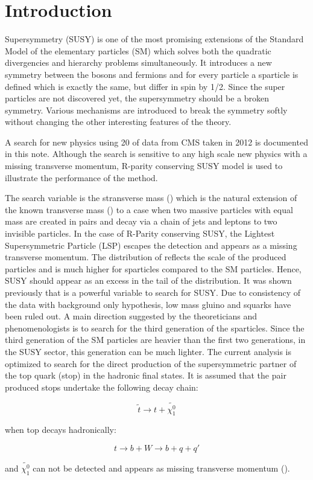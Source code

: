\section{Introduction}
\label{sect:introduction}
Supersymmetry \cite{Martin:1997ns} (SUSY) is one of the most promising extensions of the 
Standard Model of the elementary particles (SM) which solves both the 
quadratic divergencies and hierarchy problems simultaneously. It introduces a new symmetry between the bosons and fermions and 
for every particle a sparticle is defined which is exactly the same, but differ in spin by 1/2. 
Since the super particles are not discovered yet, the supersymmetry should be a broken symmetry. Various mechanisms are introduced to 
break the symmetry softly without changing the other interesting features of the theory.

A search for new physics using 20 \invfb of data from CMS taken in 2012 is documented in this note. Although the search is sensitive to any high scale 
new physics with a missing transverse momentum, R-parity conserving SUSY model is used to illustrate the performance of the method.

The search variable is the stransverse mass (\mttwo) which is the natural extension of the known transverse mass (\mt) to a case 
when two massive particles with equal mass are created in pairs and decay via a chain of jets and leptons to two invisible particles. 
In the case of R-Parity conserving SUSY, the Lightest Supersymmetric Particle (LSP) escapes the detection and appears as 
a missing transverse momentum.
The distribution of \mttwo reflects the scale of the produced particles and is much higher for sparticles
compared to the SM particles. Hence, SUSY should appear as an excess in the tail of the \mttwo distribution.
It was shown previously \cite{MT2_2011} that \mttwo is a powerful variable to search for SUSY. Due to consistency of the data with background 
only hypothesis, low mass gluino and squarks have been ruled out. A main direction suggested by the theoreticians and phenomenologists is to 
search for the third generation of the sparticles. %
Since the third generation of the SM particles are heavier than the first two generations, 
in the SUSY sector, this generation can be much lighter. The current analysis is optimized to search for the direct production of 
the supersymmetric partner of the top quark (stop) in the hadronic final states. It is assumed that the pair produced stops undertake the 
following decay chain:
\begin{linenomath}
\begin{equation}
\tilde{t} \rightarrow t + \tilde{\chi_{1}^{0}}
\end{equation}
\end{linenomath}
when top decays hadronically:
\begin{linenomath}
\begin{equation}
t \rightarrow b + W \rightarrow b + q + q'
\end{equation}
\end{linenomath}
and $\tilde{\chi_{1}^{0}}$ can not be detected and appears as missing transverse momentum (\met).

